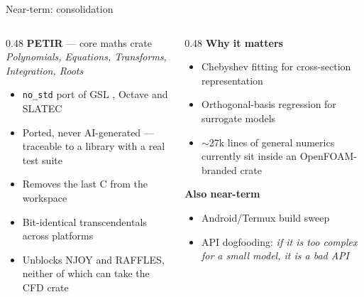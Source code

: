 \documentclass[aspectratio=169,11pt]{beamer}
\newcommand{\caveat}[1]{{\footnotesize\color{opmuted}\textit{#1}}}
\begin{document}
\begin{frame}{Near-term: consolidation}
  \begin{columns}[T]
    \begin{column}{0.48\textwidth}
      \textbf{PETIR} --- core maths crate \\
      \caveat{Polynomials, Equations, Transforms, Integration, Roots}
      \begin{itemize}
        \item \texttt{no\_std} port of GSL \cite{gsl}, Octave and SLATEC \cite{slatec}
        \item \alert{Ported, never AI-generated} --- traceable to a library with a real test suite
        \item Removes the last C from the workspace
        \item Bit-identical transcendentals across platforms
        \item Unblocks NJOY and RAFFLES, neither of which can take the CFD crate
      \end{itemize}
    \end{column}
    \begin{column}{0.48\textwidth}
      \textbf{Why it matters} \cite{trefethen_atap}
      \begin{itemize}
        \item Chebyshev fitting for cross-section representation
        \item Orthogonal-basis regression for surrogate models
        \item $\sim$27k lines of general numerics currently sit inside an OpenFOAM-branded crate
      \end{itemize}
      \vspace{0.5em}
      \textbf{Also near-term}
      \begin{itemize}
        \item Android/Termux build sweep
        \item API dogfooding: \emph{if it is too complex for a small model, it is a bad API}
      \end{itemize}
    \end{column}
  \end{columns}
\end{frame}
\end{document}
